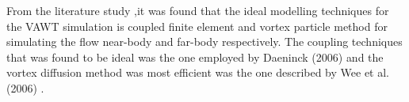 From the literature study ,it was found that the ideal modelling techniques for the VAWT simulation is coupled finite element and vortex particle method for simulating the flow near-body and far-body respectively. The coupling techniques that was found to be ideal was the one employed by Daeninck (2006) \cite{Daeninck2006} and the vortex diffusion method was most efficient was the one described by Wee et al. (2006) \cite{Wee2006}.\\

%
%
%
%
%

%
